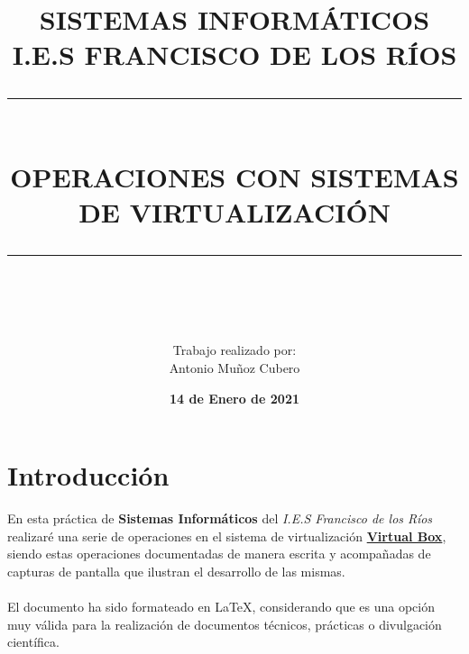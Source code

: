 \documentclass[12pt]{article}
\newcommand{\HRule}[1]{\rule{\linewidth}{#1}}
\begin{document}
\title{ \normalsize \textsc{SISTEMAS INFORMÁTICOS\\
I.E.S FRANCISCO DE LOS RÍOS}
		\\ [2.0cm]
		\HRule{0.5pt} \\
		\LARGE \textbf{\uppercase{Operaciones con sistemas de virtualización}}
		\HRule{2pt} \\ [0.5cm]
		\normalsize  \vspace*{10\baselineskip}}

\author{
        Trabajo realizado por: \\
		Antonio Muñoz Cubero
	    \normalsize  \vspace*{4\baselineskip}
		}
\date{\textbf{14 de Enero de 2021}}
\newpage
\maketitle
\newpage

\tableofcontents
\newpage

\sectionfont{\scshape}








    \section*{Introducción}
      En esta práctica de \textbf{Sistemas Informáticos} del \textit{I.E.S Francisco de los Ríos} realizaré una serie de operaciones en 
      el sistema de virtualización \href{https://www.virtualbox.org/}{\textbf{Virtual Box}}, siendo estas operaciones documentadas de 
      manera escrita y acompañadas de capturas de pantalla que ilustran el desarrollo de las mismas.
      \\\\
      El documento ha sido formateado en \LaTeX , considerando que es una opción muy válida para la realización de documentos técnicos, 
      prácticas o divulgación científica.
\end{document}
